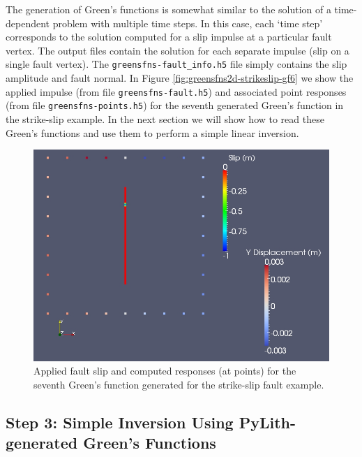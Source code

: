 The generation of Green's functions is somewhat similar to the solution
of a time-dependent problem with multiple time steps. In this case,
each `time step' corresponds to the solution computed for a slip impulse
at a particular fault vertex. The output files contain the solution
for each separate impulse (slip on a single fault vertex). The \texttt{greensfns-fault\_info.h5}
file simply contains the slip amplitude and fault normal. In Figure
\vref{fig:greensfns2d-strikeslip-gf6} we show the applied impulse
(from file \texttt{greensfns-fault.h5}) and associated point responses
(from file \texttt{greensfns-points.h5}) for the seventh generated
Green's function in the strike-slip example. In the next section we
will show how to read these Green's functions and use them to perform
a simple linear inversion.

\noindent \begin{center}
\begin{figure}
\begin{centering}
\includegraphics[scale=0.33]{tutorials/greensfns2d/figs/strikeslip_gf6}
\par\end{centering}

\caption{Applied fault slip and computed responses (at points) for the seventh
Green's function generated for the strike-slip fault example.\label{fig:greensfns2d-strikeslip-gf6}}
\end{figure}

\par\end{center}


\subsection{Step 3: Simple Inversion Using PyLith-generated Green's Functions}

